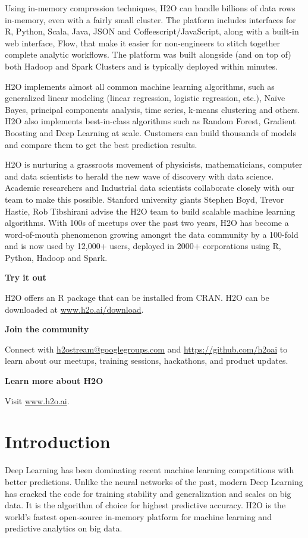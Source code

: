 \documentclass{article}[11pt]
\begin{document}
Using in-memory compression techniques, H2O can handle billions of data rows in-memory, even with a fairly small cluster. The platform includes interfaces for R, Python, Scala, Java, JSON and Coffeescript/JavaScript, along with a built-in  web interface, Flow, that make it easier for non-engineers to stitch together complete analytic workflows. The platform was built alongside (and on top of) both Hadoop and Spark Clusters and is typically deployed within minutes.

H2O implements almost all common machine learning algorithms, such as generalized linear modeling (linear regression, logistic regression, etc.), Na\"{i}ve Bayes, principal components analysis, time series, k-means clustering and others. H2O also implements best-in-class algorithms such as Random Forest, Gradient Boosting and Deep Learning at scale. Customers can build thousands of models and compare them to get the best prediction results.

H2O is nurturing a grassroots movement of physicists, mathematicians, computer and data scientists to herald the new wave of discovery with data science. Academic researchers and Industrial data scientists collaborate closely with our team to make this possible. Stanford university giants Stephen Boyd, Trevor Hastie, Rob Tibshirani advise the H2O team to build scalable machine learning algorithms. With 100s of meetups over the past two years, H2O has become a word-of-mouth phenomenon growing amongst the data community by a 100-fold and is now used by 12,000+ users, deployed in 2000+ corporations using R, Python, Hadoop and Spark.

\textbf{Try it out}

H2O offers an R package that can be installed from CRAN. H2O can be downloaded at {\url{www.h2o.ai/download}}.

\textbf{Join the community}

Connect with {\url{h2ostream@googlegroups.com}} and {\url{https://github.com/h2oai}} to learn about our meetups, training sessions, hackathons, and product updates.

\textbf{Learn more about H2O}

Visit {\url{www.h2o.ai}}.

\newpage
\section{Introduction}
Deep Learning has been dominating recent machine learning competitions with
better predictions. Unlike the neural networks of the past, modern Deep
Learning has cracked the code for training stability and generalization and
scales on big data. It is the algorithm of choice for highest predictive
accuracy. H2O is the world’s fastest open-source in-memory platform for machine
learning and predictive analytics on big data.
\end{document}
